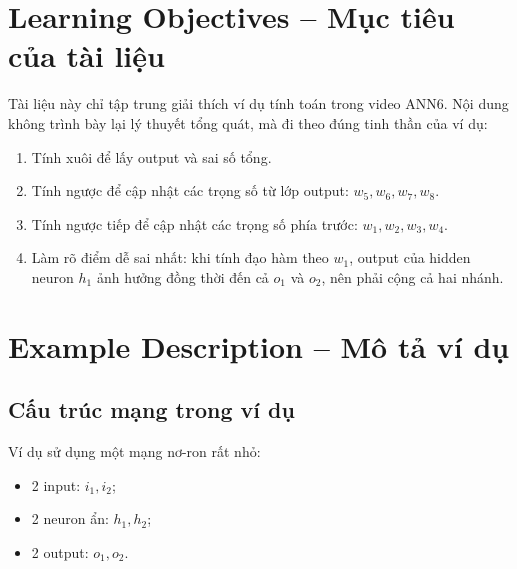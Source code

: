 

\section*{Learning Objectives -- Mục tiêu của tài liệu}

Tài liệu này chỉ tập trung giải thích ví dụ tính toán trong video ANN6. Nội dung không trình bày lại lý thuyết tổng quát, mà đi theo đúng tinh thần của ví dụ:

\begin{enumerate}[label=\arabic*.]
    \item Tính xuôi để lấy output và sai số tổng.
    \item Tính ngược để cập nhật các trọng số từ lớp output: $w_5,w_6,w_7,w_8$.
    \item Tính ngược tiếp để cập nhật các trọng số phía trước: $w_1,w_2,w_3,w_4$.
    \item Làm rõ điểm dễ sai nhất: khi tính đạo hàm theo $w_1$, output của hidden neuron $h_1$ ảnh hưởng đồng thời đến cả $o_1$ và $o_2$, nên phải cộng cả hai nhánh.
\end{enumerate}

\section{Example Description -- Mô tả ví dụ}

\subsection{Cấu trúc mạng trong ví dụ}

Ví dụ sử dụng một mạng nơ-ron rất nhỏ:

\begin{itemize}
    \item 2 input: $i_1,i_2$;
    \item 2 neuron ẩn: $h_1,h_2$;
    \item 2 output: $o_1,o_2$.
\end{itemize}

